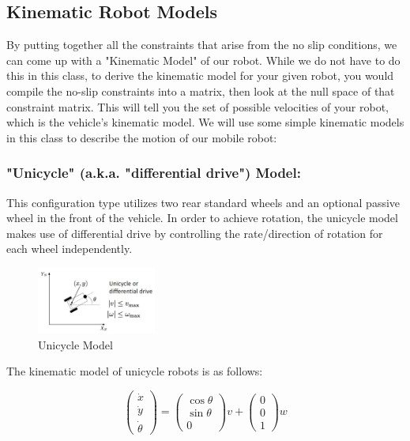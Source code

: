 \documentclass[twoside]{article}
\begin{document}
\subsection*{Kinematic Robot Models}

By putting together all the constraints that arise from the no slip conditions, we can come up with a "Kinematic Model" of our robot. While we do not have to do this in this class, to derive the kinematic model for your given robot, you would compile the no-slip constraints into a matrix, then look at the null space of that constraint matrix. This will tell you the set of possible velocities of your robot, which is the vehicle's kinematic model. We will use some simple kinematic models in this class to describe the motion of our mobile robot: 

\subsubsection*{"Unicycle" (a.k.a. "differential drive") Model:}

This configuration type utilizes two rear standard wheels and an optional passive wheel in the front of the vehicle. In order to achieve rotation, the unicycle model makes use of differential drive by controlling the rate/direction of rotation for each wheel independently\cite{sns}. 

\begin{figure}[H]
\centering
\includegraphics[width=0.35\textwidth]{unicycle}
\caption{Unicycle Model}
\end{figure}

The kinematic model of unicycle robots is as follows:

\[ \begin{pmatrix}
\dot{x} \\ \dot{y} \\ \dot{\theta}
\end{pmatrix} =
\begin{pmatrix} \cos \theta \\ \sin \theta \\ 0 \end{pmatrix} v + \begin{pmatrix} 0 \\ 0 \\ 1 \end{pmatrix} w
\]
\end{document}
